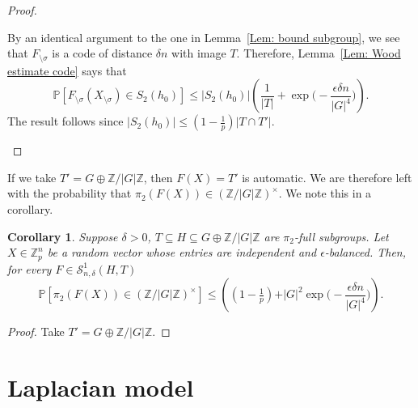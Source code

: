 \documentclass[12pt]{amsart}
\newtheorem{corollary}{Corollary}[theorem]
\theoremstyle{definition}
\newcommand{\PPP}{\mathbb{P}}
\newcommand{\SSO}[3]{\mathcal{S}^1_{#1}(#2,#3)}
\newcommand{\ZG}{\Z/\abs{G}\Z}
\newcommand{\abs}[1]{\vert#1\vert}
\newcommand{\Zp}{\Z_p}
\newcommand{\Z}{\mathbb{Z}}
\begin{document}
\begin{proof}
\begin{enumerate}
    By an identical argument to the one in Lemma~\ref{Lem: bound subgroup}, we see that $F_{\setminus\sigma}$ is a code of distance $\delta n$ with image $T$.
    Therefore, Lemma~\ref{Lem: Wood estimate code} says that
    \[
    \PPP[F_{\setminus\sigma} (X_{\setminus\sigma}) \in S_2(h_0)]
    \leq \abs{S_2(h_0)} \left(\frac{1}{\abs{T}}
    +\exp\Big(-\frac{\epsilon \delta n}{|G|^4}\Big) \right).
    \]
    The result follows since $\abs{S_2(h_0)}\leq (1-\frac{1}{p}) \abs{T\cap T'}$.
\end{enumerate}
\end{proof}

If we take $T'=G\oplus\ZG$, then $F(X)=T'$ is automatic. We are therefore left with the probability that $\pi_2(F(X))\in (\ZG)^{\times}$. We note this in a corollary.


\begin{corollary}\label{Cor: prob pi_2 is unit}
Suppose $\delta>0$, $T\subseteq H\subseteq G\oplus\ZG$ are $\pi_2$-full subgroups.
Let $X\in\Zp^n$ be a random vector whose entries are independent and $\epsilon$-balanced.
Then, for every $F\in\SSO{n,\delta}{H}{T}$
\[
\PPP[\pi_2(F(X))\in (\ZG)^{\times}]
\leq 
 \left( (1-\tfrac{1}{p})
 +\abs{G}^2\exp\Big(-\frac{\epsilon\delta n}{|G|^4}\Big) \right).
\]
\end{corollary}
\begin{proof}
Take $T'=G\oplus\ZG$.
\end{proof}





\section{Laplacian model}\label{Sec: laplacian dir}
\end{document}
